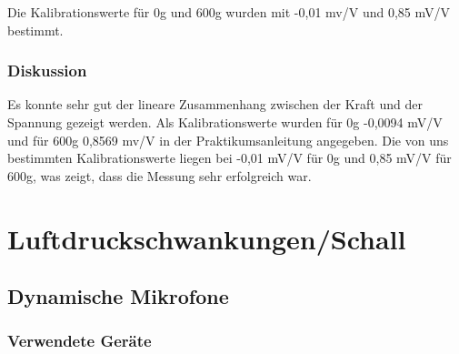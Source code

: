 \documentclass[12pt,a4paper]{article}
\begin{document}
Die Kalibrationswerte für 0g und 600g wurden mit -0,01 mv/V und 0,85 mV/V bestimmt.

\subsubsection*{Diskussion}

Es konnte sehr gut der lineare Zusammenhang zwischen der Kraft und der Spannung gezeigt werden. Als Kalibrationswerte wurden für 0g -0,0094 mV/V und für 600g 0,8569 mv/V in der Praktikumsanleitung angegeben. Die von uns bestimmten Kalibrationswerte liegen bei -0,01 mV/V für 0g und 0,85 mV/V für 600g, was zeigt, dass die Messung sehr erfolgreich war.

\section{Luftdruckschwankungen/Schall}


\subsection{Dynamische Mikrofone}
\subsubsection*{Verwendete Geräte}
\end{document}
